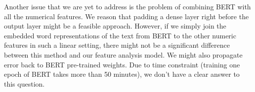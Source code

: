\documentclass{article}
\begin{document}
Another issue that we are yet to address is the problem of combining BERT with all the numerical features. We reason that padding a dense layer right before the output layer might be a feasible approach. However, if we simply join the embedded word representations of the text from BERT to the other numeric features in such a linear setting, there might not be a significant difference between this method and our feature analysis model. We might also propagate error back to BERT pre-trained weights. Due to time constraint (training one epoch of BERT takes more than 50 minutes), we don’t have a clear answer to this question. \\





\end{document}
